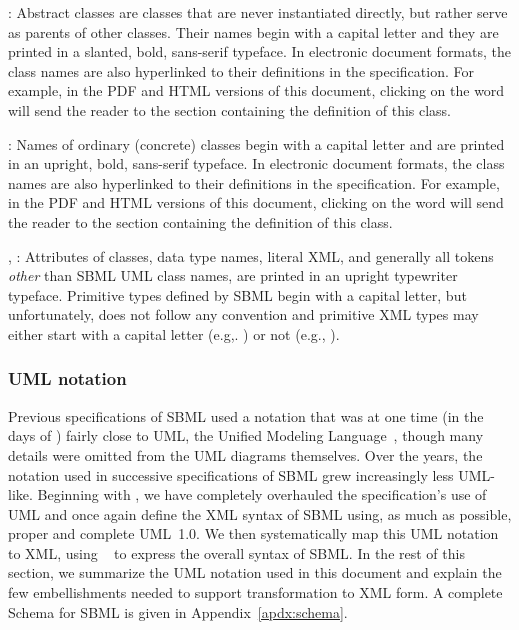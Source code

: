 \begin{description}
  
\item {}: Abstract classes are classes
  that are never instantiated directly, but rather serve as
  parents of other classes.  Their names begin with a capital
  letter and they are printed in a slanted, bold,
  sans-serif typeface.  In electronic document formats, the class
  names are also hyperlinked to their definitions in the
  specification.  For example, in the PDF and HTML versions of
  this document, clicking on the word \SBase will send the reader
  to the section containing the definition of this class.
  
\item {}: Names of ordinary (concrete) classes begin
  with a capital letter and are printed in an upright,
  bold, sans-serif typeface.  In electronic document
  formats, the class names are also hyperlinked to their
  definitions in the specification.  For example, in the PDF and
  HTML versions of this document, clicking on the word \Species
  will send the reader to the section containing the definition of
  this class.

\item {}, : Attributes
  of classes, data type names, literal XML, and generally all
  tokens \emph{other} than SBML UML class names, are printed in an
  upright typewriter typeface.  Primitive types defined by SBML
  begin with a capital letter, but unfortunately, \xmlschemaone
  does not follow any convention and primitive XML types may
  either start with a capital letter (e.g,.  ) or not
  (e.g., ).

\end{description}


\subsubsection{UML notation}
\label{sec:notation-uml}


Previous specifications of SBML used a notation that was at one
time (in the days of \sbmlone) fairly close to UML, the Unified
Modeling Language~\citep{eriksson:1998,oestereich:1999}, though
many details were omitted from the UML diagrams themselves.  Over
the years, the notation used in successive specifications of SBML
grew increasingly less UML-like.  Beginning with \sbmltwothree, we
have completely overhauled the specification's use of UML and once
again define the XML syntax of SBML using, as much as possible, proper
and complete UML~1.0.  We then systematically map this UML
notation to XML, using \xmlschemaone~\citep{biron:2000,fallside:2000,thompson:2000} to express
the overall syntax of SBML.  In the rest of this section, we
summarize the UML notation used in this document and explain the
few embellishments needed to support transformation to XML form.
A complete Schema for SBML is given in Appendix~\ref{apdx:schema}.

